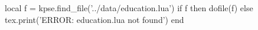 \begin{luacode}
  local f = kpse.find_file('../data/education.lua')
  if f then dofile(f) else tex.print('ERROR: education.lua not found') end
\end{luacode}

\def\education{%
  \school{\lv{education.school}}
  \location{\lv{education.location}}
  \degree{\lv{education.degree}}
}
